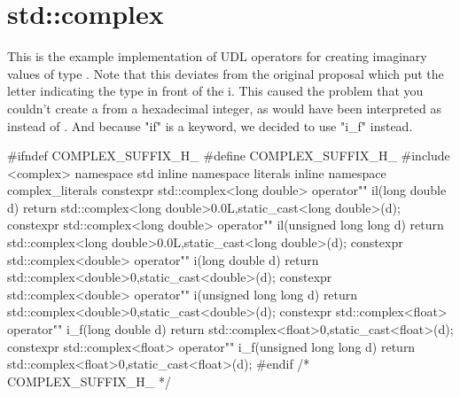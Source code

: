\documentclass[ebook,11pt,article]{memoir}
\begin{document}
\section{std::complex}
This is the example implementation of UDL operators for creating imaginary values of type . Note that this deviates from the original proposal which put the letter indicating the type in front of the i. This caused the problem that you couldn't create a  from a hexadecimal integer, as  would have been interpreted as  instead of . And because "if" is a keyword, we decided to use "i_f" instead.
\begin{codeblock}
#ifndef COMPLEX_SUFFIX_H_
#define COMPLEX_SUFFIX_H_
#include <complex>
namespace std{
inline namespace literals{
inline namespace complex_literals{
constexpr
std::complex<long double> operator"" il(long double d){
	return std::complex<long double>{0.0L,static_cast<long double>(d)};
}
constexpr
std::complex<long double> operator"" il(unsigned long long d){
	return std::complex<long double>{0.0L,static_cast<long double>(d)};
}
constexpr
std::complex<double> operator"" i(long double d){
	return std::complex<double>{0,static_cast<double>(d)};
}
constexpr
std::complex<double> operator"" i(unsigned long long d){
	return std::complex<double>{0,static_cast<double>(d)};
}
constexpr
std::complex<float> operator"" i_f(long double d){
	return std::complex<float>{0,static_cast<float>(d)};
}
constexpr
std::complex<float> operator"" i_f(unsigned long long d){
	return std::complex<float>{0,static_cast<float>(d)};
}
}}}
#endif /* COMPLEX_SUFFIX_H_ */
\end{codeblock}
\end{document}
